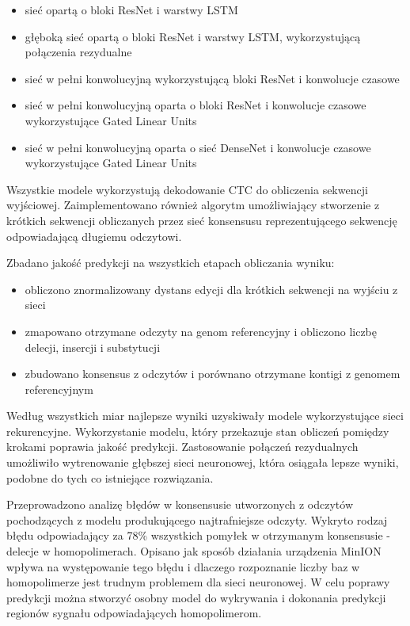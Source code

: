 \documentclass[a4paper,11pt,twoside]{report}
\theoremstyle{definition}
\begin{document}
\begin{itemize}
	\item sieć opartą o bloki ResNet i warstwy LSTM
	\item głęboką sieć opartą o bloki ResNet i warstwy LSTM, wykorzystującą połączenia rezydualne
	\item sieć w pełni konwolucyjną wykorzystującą bloki ResNet i konwolucje czasowe
	\item sieć w pełni konwolucyjną oparta o bloki ResNet i konwolucje czasowe wykorzystujące Gated Linear Units
	\item sieć w pełni konwolucyjną oparta o sieć DenseNet i konwolucje czasowe wykorzystujące Gated Linear Units
\end{itemize}

Wszystkie modele wykorzystują dekodowanie CTC do obliczenia sekwencji wyjściowej. Zaimplementowano również algorytm umożliwiający stworzenie z krótkich sekwencji obliczanych przez sieć konsensusu reprezentującego sekwencję odpowiadającą długiemu odczytowi.

Zbadano jakość predykcji na wszystkich etapach obliczania wyniku:

\begin{itemize}
	\item obliczono znormalizowany dystans edycji dla krótkich sekwencji na wyjściu z sieci
	\item zmapowano otrzymane odczyty na genom referencyjny i obliczono liczbę delecji, insercji i substytucji
	\item zbudowano konsensus z odczytów i porównano otrzymane kontigi z  genomem referencyjnym
\end{itemize}

Według wszystkich miar najlepsze wyniki uzyskiwały modele wykorzystujące sieci rekurencyjne. Wykorzystanie modelu, który przekazuje stan obliczeń pomiędzy krokami poprawia jakość predykcji. Zastosowanie połączeń rezydualnych umożliwiło wytrenowanie głębszej sieci neuronowej, która osiągała lepsze wyniki, podobne do tych co istniejące rozwiązania.

Przeprowadzono analizę błędów w konsensusie utworzonych z odczytów pochodzących z modelu produkującego najtrafniejsze odczyty. Wykryto rodzaj błędu odpowiadający za 78\% wszystkich pomyłek w otrzymanym konsensusie - delecje w homopolimerach. Opisano jak sposób działania urządzenia MinION wpływa na występowanie tego błędu i dlaczego rozpoznanie liczby baz w homopolimerze jest trudnym problemem dla sieci neuronowej. W celu poprawy predykcji można stworzyć osobny model do wykrywania i dokonania predykcji regionów sygnału odpowiadających homopolimerom.
\end{document}
